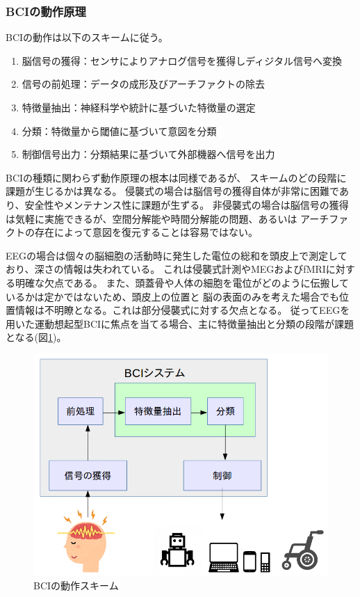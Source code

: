 \subsubsection{\rm BCI\mc の動作原理}
BCIの動作は以下のスキームに従う。
\begin{enumerate}
    \item 脳信号の獲得：センサによりアナログ信号を獲得しディジタル信号へ変換
    \item 信号の前処理：データの成形及びアーチファクトの除去
    \item 特徴量抽出：神経科学や統計に基づいた特徴量の選定
    \item 分類：特徴量から閾値に基づいて意図を分類
    \item 制御信号出力：分類結果に基づいて外部機器へ信号を出力
\end{enumerate}
BCIの種類に関わらず動作原理の根本は同様であるが、
スキームのどの段階に課題が生じるかは異なる。
侵襲式の場合は脳信号の獲得自体が非常に困難であり、安全性やメンテナンス性に課題が生ずる。
非侵襲式の場合は脳信号の獲得は気軽に実施できるが、空間分解能や時間分解能の問題、あるいは
アーチファクトの存在によって意図を復元することは容易ではない。

EEGの場合は個々の脳細胞の活動時に発生した電位の総和を頭皮上で測定しており、深さの情報は失われている。
これは侵襲式計測やMEGおよびfMRIに対する明確な欠点である。
また、頭蓋骨や人体の細胞を電位がどのように伝搬しているかは定かではないため、頭皮上の位置と
脳の表面のみを考えた場合でも位置情報は不明瞭となる。これは部分侵襲式に対する欠点となる。
従ってEEGを用いた運動想起型BCIに焦点を当てる場合、主に特徴量抽出と分類の段階が課題となる(図\ref{fig:BCIsystem})。

\begin{figure}[tb]
    \centering
    \includegraphics[width=14cm]{images/BCIsystem.png}
    \caption{BCIの動作スキーム}
    \label{fig:BCIsystem}
\end{figure}

